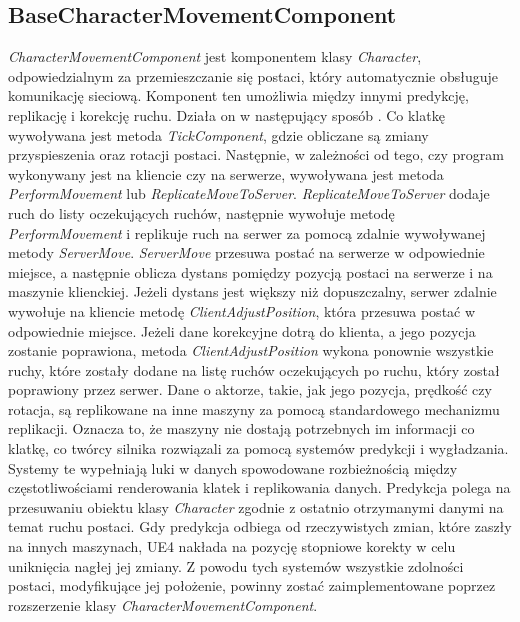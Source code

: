 \documentclass[multip]{SGGW-thesis}
\begin{document}
\subsection{BaseCharacterMovementComponent}
{\em CharacterMovementComponent} jest komponentem klasy {\em Character}, odpowiedzialnym za przemieszczanie się postaci, który automatycznie obsługuje komunikację sieciową. Komponent ten umożliwia między innymi predykcję, replikację i korekcję ruchu. Działa on w następujący sposób \cite{docs-charactermovementcomponent}. Co klatkę wywoływana jest metoda {\em TickComponent}, gdzie obliczane są zmiany przyspieszenia oraz rotacji postaci. Następnie, w zależności od tego, czy program wykonywany jest na kliencie czy na serwerze, wywoływana jest metoda {\em PerformMovement} lub {\em ReplicateMoveToServer}. {\em ReplicateMoveToServer} dodaje ruch do listy oczekujących ruchów, następnie wywołuje metodę {\em PerformMovement} i replikuje ruch na serwer za pomocą zdalnie wywoływanej metody {\em ServerMove}. {\em ServerMove} przesuwa postać na serwerze w odpowiednie miejsce, a następnie oblicza dystans pomiędzy pozycją postaci na serwerze i na maszynie klienckiej. Jeżeli dystans jest większy niż dopuszczalny, serwer zdalnie wywołuje na kliencie metodę {\em ClientAdjustPosition}, która przesuwa postać w odpowiednie miejsce. Jeżeli dane korekcyjne dotrą do klienta, a jego pozycja zostanie poprawiona, metoda {\em ClientAdjustPosition} wykona ponownie wszystkie ruchy, które zostały dodane na listę ruchów oczekujących po ruchu, który został poprawiony przez serwer.
\newline \indent Dane o aktorze, takie, jak jego pozycja, prędkość czy rotacja, są replikowane na inne maszyny za pomocą standardowego mechanizmu replikacji. Oznacza to, że maszyny nie dostają potrzebnych im informacji co klatkę, co twórcy silnika rozwiązali za pomocą systemów predykcji i wygładzania. Systemy te wypełniają luki w danych spowodowane rozbieżnością między częstotliwościami renderowania klatek i replikowania danych. Predykcja polega na przesuwaniu obiektu klasy {\em Character} zgodnie z ostatnio otrzymanymi danymi na temat ruchu postaci. Gdy predykcja odbiega od rzeczywistych zmian, które zaszły na innych maszynach, UE4 nakłada na pozycję stopniowe korekty w celu uniknięcia nagłej jej zmiany.
\newline \indent Z powodu tych systemów wszystkie zdolności postaci, modyfikujące jej położenie, powinny zostać zaimplementowane poprzez rozszerzenie klasy {\em CharacterMovementComponent}.
\end{document}
